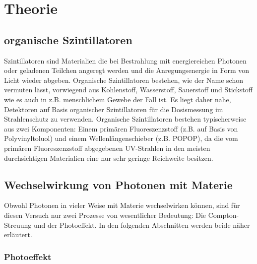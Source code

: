 \section{Theorie}

\subsection{organische Szintillatoren}

Szintillatoren sind  Materialien die bei Bestrahlung mit energiereichen Photonen oder geladenen Teilchen angeregt werden und die Anregungsenergie in Form von Licht wieder abgeben. Organische Szintillatoren bestehen, wie der Name schon vermuten lässt, vorwiegend aus Kohlenstoff, Wasserstoff, Sauerstoff und Stickstoff wie es auch in z.B. menschlichem Gewebe der Fall ist. Es liegt daher nahe, Detektoren auf Basis organischer Szintillatoren für die Dosismessung im Strahlenschutz zu verwenden. Organische Szintillatoren bestehen typischerweise aus zwei Komponenten: Einem primären Fluoreszenzstoff (z.B. auf Basis von Polyvinyltoluol) und einem \glqq Wellenlängenschieber \grqq{} (z.B. POPOP), da die vom primären Fluoreszenzstoff abgegebenen UV-Strahlen in den meisten durchsichtigen Materialien eine nur sehr geringe Reichweite besitzen.

\subsection{Wechselwirkung von Photonen mit Materie}

Obwohl Photonen in vieler Weise mit Materie wechselwirken können, sind für diesen Versuch nur zwei Prozesse von wesentlicher Bedeutung: Die Compton-Streuung und der Photoeffekt. In den folgenden Abschnitten werden beide näher erläutert.

\subsubsection{Photoeffekt}

